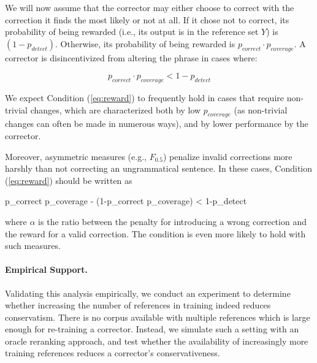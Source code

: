 \documentclass[a4paper, 11pt]{article}
\newenvironment{myequation}{
  \vspace{-1em}
 \begin{equation}
}{
 \end{equation}
 \vspace{-1.2em}
}
\newenvironment{myequation*}{
	\vspace{-1em}
	\begin{equation*}
}{
\end{equation*}
\vspace{-1.2em}
}
\begin{document}
We will now assume that the corrector may either choose to correct with the correction it finds 
the most likely or not at all. If it chose not to correct, its probability of being rewarded 
(i.e., its output is in the reference set $Y$) is $(1-p_{detect})$. Otherwise, its probability
of being rewarded is $p_{correct} \cdot p_{coverage}$.
A corrector is disincentivized from altering the phrase in cases where:

\vspace{.1cm}
\begin{small}
	\begin{myequation}
		\label{eq:reward}
		p_{correct} \cdot p_{coverage} < 1-p_{detect} 
	\end{myequation}
	\vspace{-.1cm}
\end{small}


We expect Condition (\ref{eq:reward}) to frequently hold in cases that
require non-trivial changes, which are characterized both by low $p_{coverage}$ (as non-trivial
changes can often be made in numerous ways), and by lower performance by the corrector.

Moreover, asymmetric measures (e.g., $F_{0.5}$) penalize invalid corrections more
harshly than not correcting an ungrammatical sentence.
In these cases, Condition (\ref{eq:reward}) should be written as

\begin{small}
	\vspace{-.1cm}
	\begin{myequation*}
		p_{correct} \cdot p_{coverage} - \left(1-p_{correct} \cdot p_{coverage}\right) \alpha < 1-p_{detect} 
	\end{myequation*}
	\vspace{-.1cm}
\end{small}

\noindent
where $\alpha$ is the ratio between the penalty for introducing a wrong correction and the reward for a valid correction. The condition is even more likely to hold with such measures.

\paragraph{Empirical Support.}
Validating this analysis empirically, we conduct an experiment to determine whether increasing
the number of references in training indeed reduces conservatism. There is no 
corpus available with multiple references which is large enough for re-training a corrector. 
Instead, we simulate such a setting with an oracle reranking approach, and test whether the 
availability of increasingly more training references reduces a corrector's conservativeness.
\end{document}
